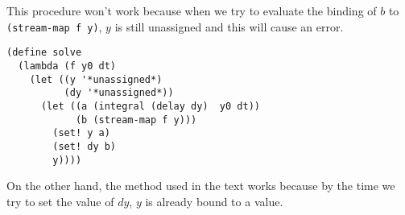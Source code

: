\documentclass[a4paper,12pt]{article}
\begin{document}
This procedure won't work because when we try to evaluate the binding
of $b$ to \lstinline!(stream-map f y)!, $y$ is still unassigned and
this will cause an error.

\begin{lstlisting}
(define solve
  (lambda (f y0 dt)
    (let ((y '*unassigned*)
          (dy '*unassigned*))
      (let ((a (integral (delay dy)  y0 dt))
            (b (stream-map f y)))
        (set! y a)
        (set! dy b)
        y))))
\end{lstlisting}

On the other hand, the method used in the text works because by the
time we try to set the value of $dy$,  $y$ is already bound to a
value.
\end{document}
